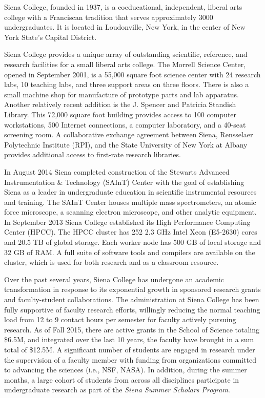 \documentclass[11pt, preprint]{aastex}
\begin{document}
Siena College, founded in 1937, is a coeducational, independent, liberal arts
college with a Franciscan tradition that serves approximately 3000
undergraduates. It is located in Loudonville, New York, in the center of New
York State's Capital District.
					
Siena College provides a unique array of outstanding scientific, reference, and
research facilities for a small liberal arts college.  The Morrell Science
Center, opened in September 2001, is a 55,000 square foot science center with 24
research labs, 10 teaching labs, and three support areas on three floors.  There
is also a small machine shop for manufacture of prototype parts and lab
apparatus.  Another relatively recent addition is the J. Spencer and Patricia
Standish Library. This 72,000 square foot building provides access to 100
computer workstations, 500 Internet connections, a computer laboratory, and a
40-seat screening room. A collaborative exchange agreement between Siena,
Rensselaer Polytechnic Institute (RPI), and the State University of New York at
Albany provides additional access to first-rate research libraries.

In August 2014 Siena completed construction of the Stewarts Advanced
Instrumentation \& Technology (SAInT) Center with the goal of establishing Siena
as a leader in undergraduate education in scientific instrumental resources and
training. The SAInT Center houses multiple mass spectrometers, an atomic force
microscope, a scanning electron microscope, and other analytic equipment.  In
September 2013 Siena College established its High Performance Computing Center
(HPCC).  The HPCC cluster has 252 2.3 GHz Intel Xeon (E5-2630) cores and 20.5 TB
of global storage.  Each worker node has 500 GB of local storage and 32 GB of
RAM. A full suite of software tools and compilers are available on the cluster,
which is used for both research and as a classroom resource.

Over the past several years, Siena College has undergone an academic
transformation in response to its exponential growth in sponsored research
grants and faculty-student collaborations.  The administration at Siena College
has been fully supportive of faculty research efforts, willingly reducing the
normal teaching load from 12 to 9 contact hours per semester for faculty
actively pursuing research.  As of Fall 2015, there are active grants in the
School of Science totaling \$6.5M, and integrated over the last 10 years, the
faculty have brought in a sum total of \$12.5M.  A significant number of
students are engaged in research under the supervision of a faculty member with
funding from organizations committed to advancing the sciences (i.e., NSF,
NASA).  In addition, during the summer months, a large cohort of students from
across all disciplines participate in undergraduate research as part of the
{\em Siena Summer Scholars Program}.
	
\end{document}

